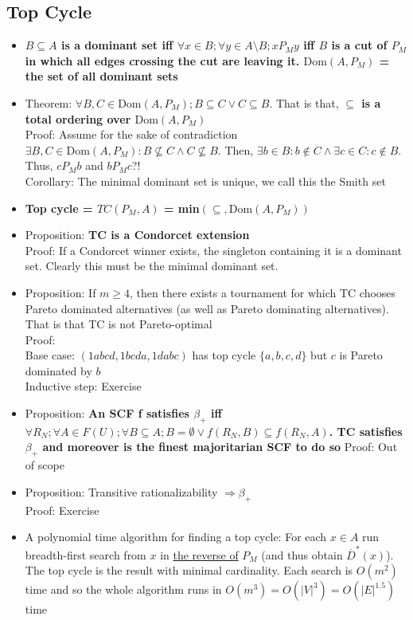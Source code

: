 \documentclass[20pt,a4paper,landscape]{extarticle}
\begin{document}
\begin{flushleft}
\subsection{Top Cycle}
\begin{itemize}
\item \textbf{$B \subseteq A$ is a dominant set iff $\forall x \in B; \forall y \in A \setminus B; xP_My$ iff $B$ is a cut of $P_M$ in which all edges crossing the cut are leaving it. $\textrm{Dom}(A, P_M)$ = the set of all dominant sets}
\item Theorem: $\forall B, C \in \textrm{Dom}(A, P_M); B \subseteq C \lor C \subseteq B$. That is that, \textbf{$\subseteq$ is a total ordering over $\textrm{Dom}(A, P_M)$}\\
Proof: Assume for the sake of contradiction $\exists B, C \in \textrm{Dom}(A, P_M): B \not\subseteq C \land C \not\subseteq B$. Then, $\exists b \in B: b \notin C \land \exists c \in C: c \notin B$. Thus, $cP_Mb$ and $bP_Mc$?!\\
Corollary: The minimal dominant set is unique, we call this the Smith set
\item \textbf{Top cycle = $TC(P_M, A)$ = min$(\subseteq, \textrm{Dom}(A, P_M))$}
\item Proposition: \textbf{TC is a Condorcet extension}\\
Proof: If a Condorcet winner exists, the singleton containing it is a dominant set. Clearly this must be the minimal dominant set.
\item Proposition: If $m \geq 4$, then there exists a tournament for which TC chooses Pareto dominated alternatives (as well as Pareto dominating alternatives). That is that TC is not Pareto-optimal\\
Proof:\\
Base case: $(1abcd, 1bcda, 1dabc)$ has top cycle $\{a, b, c, d\}$ but $c$ is Pareto dominated by $b$\\
Inductive step: Exercise
\item Proposition: \textbf{An SCF f satisfies $\beta_+$ iff $\forall R_N; \forall A \in F(U); \forall B \subseteq A; B = \emptyset \lor f(R_N, B) \subseteq f(R_N, A)$. TC satisfies $\beta_+$ and moreover is the finest majoritarian SCF to do so}
Proof: Out of scope
\item Proposition: Transitive rationalizability $\Rightarrow \beta_+$\\
Proof: Exercise
\clearpage
\item A polynomial time algorithm for finding a top cycle: For each $x \in A$ run breadth-first search from $x$ in \underline{the reverse of} $P_M$ (and thus obtain $\overline{D}^\ast(x)$). The top cycle is the result with minimal cardinality. Each search is $O(m^2)$ time and so the whole algorithm runs in $O(m^3) = O(|V|^3) = O(|E|^{1.5})$ time

\end{itemize}
\end{flushleft}
\end{document}
